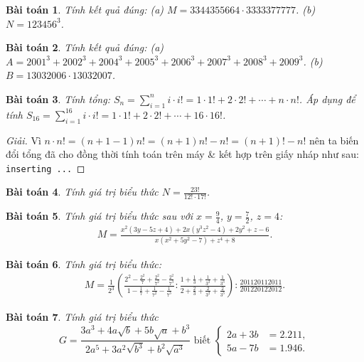 \documentclass{article}
\newtheorem{baitoan}{Bài toán}
\begin{document}
\begin{baitoan}
	Tính kết quả đúng: (a) $M = 3344355664\cdot3333377777$. (b) $N = 123456^3$.
\end{baitoan}

\begin{baitoan}
	Tính kết quả đúng: (a) $A = 2001^3 + 2002^3 + 2004^3 + 2005^3 + 2006^3 + 2007^3 + 2008^3 + 2009^3$. (b) $B = 13032006\cdot13032007$.
\end{baitoan}

\begin{baitoan}
	Tính tổng: $S_n = \sum_{i=1}^n i\cdot i! = 1\cdot1! + 2\cdot2! + \cdots + n\cdot n!$. Áp dụng để tính $S_{16} = \sum_{i=1}^{16} i\cdot i! = 1\cdot1! + 2\cdot2! + \cdots + 16\cdot16!$.
\end{baitoan}

\begin{proof}[Giải]
	Vì $n\cdot n! = (n + 1 - 1)n! = (n + 1)n! - n! = (n + 1)! - n!$ nên ta biến đổi tổng đã cho đồng thời tính toán trên máy \& kết hợp trên giấy nháp như sau: \texttt{inserting ...}
\end{proof}

\begin{baitoan}
	Tính giá trị biểu thức $N = \frac{23!}{12!\cdot17!}$.
\end{baitoan}

\begin{baitoan}
	Tính giá trị biểu thức sau với $x = \frac{9}{4}$, $y = \frac{7}{2}$, $z = 4$:
	\begin{align*}
		M = \frac{x^2(3y - 5z + 4) + 2x(y^3z^2 - 4) + 2y^2 + z - 6}{x(x^2 + 5y^2 - 7) + z^4 + 8}.
	\end{align*}
\end{baitoan}

\begin{baitoan}
	Tính giá trị biểu thức:
	\begin{align*}
		M = \frac{1}{2^3}\left(\frac{2^2 - \frac{2^2}{7} + \frac{2^2}{7^2} - \frac{2^2}{7^3}}{1 - \frac{1}{7} + \frac{1}{7^2} - \frac{1}{7^3}}:\frac{1 + \frac{1}{3} + \frac{1}{3^2}  + \frac{1}{3^3}}{2 + \frac{2}{3} + \frac{2}{3^2}  + \frac{2}{3^3}}\right):\frac{201120112011}{201220122012}.
	\end{align*}
\end{baitoan}

\begin{baitoan}
	Tính giá trị biểu thức
	\begin{equation*}
		G = \frac{3a^3 + 4a\sqrt{b} + 5b\sqrt{a} + b^3}{2a^5 + 3a^2\sqrt{b^3} + b^2\sqrt{a^3}}\mbox{ biết }\left\{\begin{split}
			2a + 3b &= 2.211,\\
			5a - 7b &= 1.946.
		\end{split}\right.
	\end{equation*}
\end{baitoan}
\end{document}
